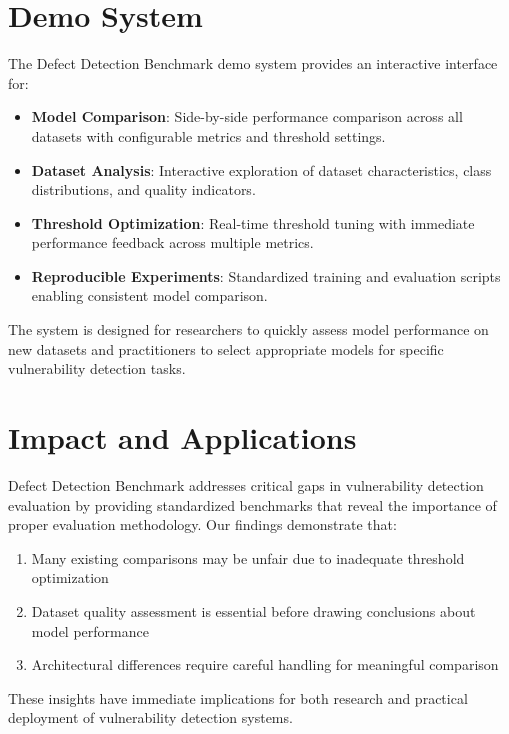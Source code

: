 \documentclass[letterpaper]{article}
\begin{document}
\section{Demo System}

The Defect Detection Benchmark demo system provides an interactive interface for:

\begin{itemize}
	\item \textbf{Model Comparison}: Side-by-side performance comparison across all datasets with configurable metrics and threshold settings.
	\item \textbf{Dataset Analysis}: Interactive exploration of dataset characteristics, class distributions, and quality indicators.
	\item \textbf{Threshold Optimization}: Real-time threshold tuning with immediate performance feedback across multiple metrics.
	\item \textbf{Reproducible Experiments}: Standardized training and evaluation scripts enabling consistent model comparison.
\end{itemize}

The system is designed for researchers to quickly assess model performance on new datasets and practitioners to select appropriate models for specific vulnerability detection tasks.

\section{Impact and Applications}

Defect Detection Benchmark addresses critical gaps in vulnerability detection evaluation by providing standardized benchmarks that reveal the importance of proper evaluation methodology. Our findings demonstrate that:

\begin{enumerate}
	\item Many existing comparisons may be unfair due to inadequate threshold optimization
	\item Dataset quality assessment is essential before drawing conclusions about model performance
	\item Architectural differences require careful handling for meaningful comparison
\end{enumerate}

These insights have immediate implications for both research and practical deployment of vulnerability detection systems.
\end{document}
